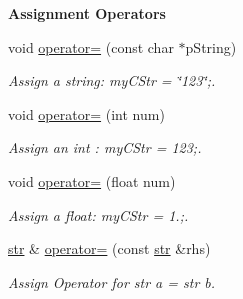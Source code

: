 \begin{Indent}{\bf Assignment Operators}\par
\begin{DoxyCompactItemize}
\item 
void \hyperlink{classstr_a04bb8d4e673cc83346f6d9de00757929}{operator=} (const char $\ast$p\+String)
\begin{DoxyCompactList}\small\item\em Assign a string\+: my\+C\+Str = \char`\"{}123\char`\"{};. \end{DoxyCompactList}\item 
void \hyperlink{classstr_a04e0c0be4932ee0ba8715985d489f78d}{operator=} (int num)
\begin{DoxyCompactList}\small\item\em Assign an int \+: my\+C\+Str = 123;. \end{DoxyCompactList}\item 
void \hyperlink{classstr_a53784815b19184e4e0a9658211347dbf}{operator=} (float num)
\begin{DoxyCompactList}\small\item\em Assign a float\+: my\+C\+Str = 1.;. \end{DoxyCompactList}\item 
\hyperlink{classstr}{str} \& \hyperlink{classstr_a9142043f01db80275d3b342a28dc1ee5}{operator=} (const \hyperlink{classstr}{str} \&rhs)
\begin{DoxyCompactList}\small\item\em Assign Operator for str a = str b. \end{DoxyCompactList}\end{DoxyCompactItemize}
\end{Indent}
